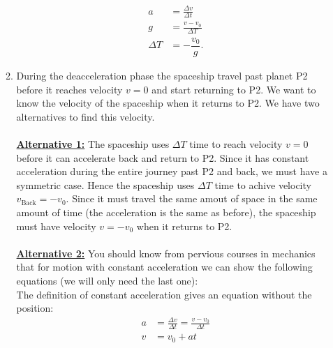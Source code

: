 \documentclass[a4paper,10pt,english]{article}
\begin{document}
\begin{enumerate}
\begin{enumerate}
\begin{align*}
a&=\frac{\Delta v}{\Delta t}\\
g&=\frac{v-v_{0}}{\Delta T}\\
\Delta T&=-\dfrac{v_{0}}{g}.
\end{align*}

\item During the deacceleration phase the spaceship travel past planet P2 before it reaches velocity $v=0$ and start returning to P2. We want to know the velocity of the spaceship when it returns to P2. We have two alternatives to find this velocity.
\\ \\
\underline{\textbf{Alternative 1:}} The spaceship uses $\Delta T$ time to reach velocity $v=0$ before it can accelerate back and return to P2. Since it has constant acceleration during the entire journey past P2 and back, we must have a symmetric case. Hence the spaceship uses $\Delta T$ time to achive velocity $v_{\text{Back}}=-v_{0}$. Since it must travel the same amout of space in the same amount of time (the acceleration is the same as before), the spaceship must have velocity $v=-v_{0}$ when it returns to P2.
\\
\\
\underline{\textbf{Alternative 2:}} You should know from pervious courses in mechanics that for motion with constant acceleration we can show the following equations (we will only need the last one):\\


The definition of constant acceleration gives an equation without the position:
\begin{align}\label{eq:def_acc_2}
a&=\frac{\Delta v}{\Delta t}=\frac{v-v_{0}}{\Delta t} \nonumber\\
v&=v_{0}+at
\end{align}


\end{enumerate}
\end{enumerate}
\end{document}
